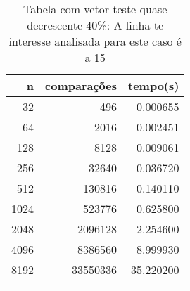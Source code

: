 \begin{table}[ht]
\centering
\begin{tabular}{rrr} \toprule
        n &    comparações &       tempo(s) \\ \midrule
      32  &            496 &      0.000655 \\
      64  &           2016 &      0.002451 \\
     128  &           8128 &      0.009061 \\
     256  &          32640 &      0.036720 \\
     512  &         130816 &      0.140110 \\
    1024  &         523776 &      0.625800 \\
    2048  &        2096128 &      2.254600 \\
    4096  &        8386560 &      8.999930 \\
    8192  &       33550336 &     35.220200 \\
\bottomrule\addlinespace
\end{tabular}
\caption{Tabela com vetor teste quase decrescente 40\%: A linha te interesse analisada para este caso é a 15}
\label{tab:selectionsortQuaseDecresc40}
\end{table}

